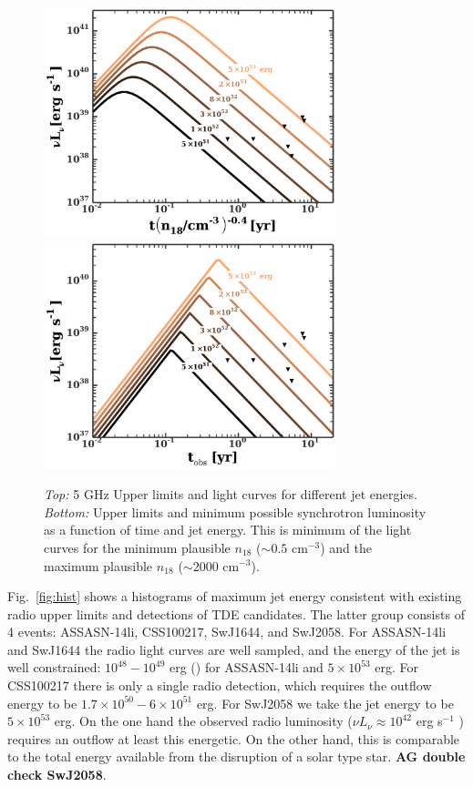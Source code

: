 \documentclass[usenatbib,fleqn]{mnras}
\begin{document}
\begin{figure}
\includegraphics[width=8.5cm]{e_contours1.pdf}
\includegraphics[width=8.5cm]{e_contours2.pdf}
\caption{\label{fig:econtours} {\it Top:} 5 GHz Upper limits and light
  curves for different jet energies. {\it Bottom:} Upper limits and
  minimum possible synchrotron luminosity as a function of time and
  jet energy. This is minimum of the light curves for the minimum
  plausible $n_{18}$ ($\sim 0.5$ cm$^{-3}$) and the maximum plausible
  $n_{18}$ ($\sim 2000$ cm$^{-3}$).}
\end{figure}

Fig.~\ref{fig:hist} shows a histograms of maximum jet energy
consistent with existing radio upper limits and detections of TDE
candidates. The latter group consists of 4 events: ASSASN-14li,
CSS100217, SwJ1644, and SwJ2058. For ASSASN-14li and SwJ1644 the radio
light curves are well sampled, and the energy of the jet is well
constrained: $10^{48}-10^{49}$ erg (\citealt{van-Velzen+2015,
  Alexander+2015}) for ASSASN-14li and $5\times 10^{53}$ erg. For
CSS100217 there is only a single radio detection, which requires the
outflow energy to be $1.7\times 10^{50}-6\times 10^{51}$ erg. For
SwJ2058 we take the jet energy to be $5\times 10^{53}$ erg. On the one
hand the observed radio luminosity ($\nu L_{\nu }\approx 10^{42}$ erg
s$^{-1}$ \citep{Cenko+2012}) requires an outflow at least this
energetic. On the other hand, this is comparable to the total energy
available from the disruption of a solar type star. {\bf AG double
  check SwJ2058}.
\end{document}
